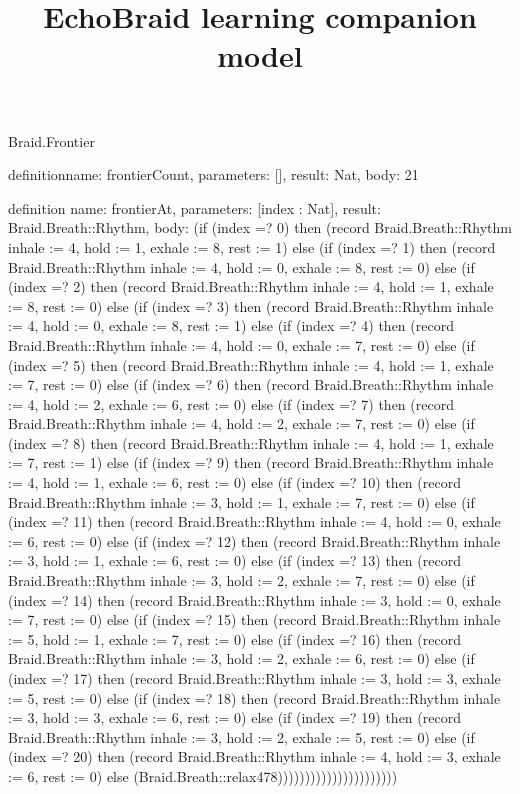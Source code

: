 \begin{lexlean}{Braid.Frontier}
\title{EchoBraid learning companion model}
\begin{semanticmodule}
definition{name: frontierCount, parameters: [], result: Nat, body: 21}

definition{
  name: frontierAt,
  parameters: [index : Nat],
  result: Braid.Breath::Rhythm,
  body: (if (index =? 0) then (record Braid.Breath::Rhythm {inhale := 4, hold := 1, exhale := 8, rest := 1}) else (if (index =? 1) then (record Braid.Breath::Rhythm {inhale := 4, hold := 0, exhale := 8, rest := 0}) else (if (index =? 2) then (record Braid.Breath::Rhythm {inhale := 4, hold := 1, exhale := 8, rest := 0}) else (if (index =? 3) then (record Braid.Breath::Rhythm {inhale := 4, hold := 0, exhale := 8, rest := 1}) else (if (index =? 4) then (record Braid.Breath::Rhythm {inhale := 4, hold := 0, exhale := 7, rest := 0}) else (if (index =? 5) then (record Braid.Breath::Rhythm {inhale := 4, hold := 1, exhale := 7, rest := 0}) else (if (index =? 6) then (record Braid.Breath::Rhythm {inhale := 4, hold := 2, exhale := 6, rest := 0}) else (if (index =? 7) then (record Braid.Breath::Rhythm {inhale := 4, hold := 2, exhale := 7, rest := 0}) else (if (index =? 8) then (record Braid.Breath::Rhythm {inhale := 4, hold := 1, exhale := 7, rest := 1}) else (if (index =? 9) then (record Braid.Breath::Rhythm {inhale := 4, hold := 1, exhale := 6, rest := 0}) else (if (index =? 10) then (record Braid.Breath::Rhythm {inhale := 3, hold := 1, exhale := 7, rest := 0}) else (if (index =? 11) then (record Braid.Breath::Rhythm {inhale := 4, hold := 0, exhale := 6, rest := 0}) else (if (index =? 12) then (record Braid.Breath::Rhythm {inhale := 3, hold := 1, exhale := 6, rest := 0}) else (if (index =? 13) then (record Braid.Breath::Rhythm {inhale := 3, hold := 2, exhale := 7, rest := 0}) else (if (index =? 14) then (record Braid.Breath::Rhythm {inhale := 3, hold := 0, exhale := 7, rest := 0}) else (if (index =? 15) then (record Braid.Breath::Rhythm {inhale := 5, hold := 1, exhale := 7, rest := 0}) else (if (index =? 16) then (record Braid.Breath::Rhythm {inhale := 3, hold := 2, exhale := 6, rest := 0}) else (if (index =? 17) then (record Braid.Breath::Rhythm {inhale := 3, hold := 3, exhale := 5, rest := 0}) else (if (index =? 18) then (record Braid.Breath::Rhythm {inhale := 3, hold := 3, exhale := 6, rest := 0}) else (if (index =? 19) then (record Braid.Breath::Rhythm {inhale := 3, hold := 2, exhale := 5, rest := 0}) else (if (index =? 20) then (record Braid.Breath::Rhythm {inhale := 4, hold := 3, exhale := 6, rest := 0}) else (Braid.Breath::relax478))))))))))))))))))))))
}


\end{semanticmodule}
\end{lexlean}
